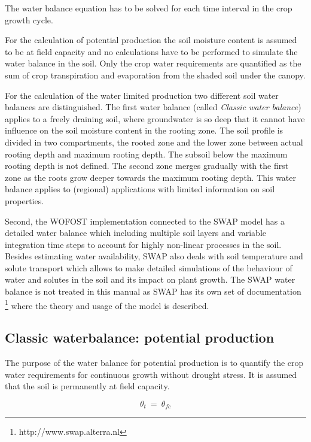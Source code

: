 The water balance equation has to be solved for each time interval in the crop growth cycle.

For the calculation of potential production the soil moisture content is
assumed to be at field capacity and no calculations have to be performed to simulate the
water balance in the soil. Only the crop water requirements are quantified as the sum of 
crop transpiration and evaporation from the shaded soil under the canopy. 

For the calculation of the water limited production two different soil water balances are
distinguished. The first water balance (called \emph{Classic water balance}) applies to a freely draining soil, 
where groundwater is so deep that it cannot have influence on the soil moisture content in the rooting zone. 
The soil profile is divided in two compartments, the rooted zone and the lower zone between actual rooting
depth and maximum rooting depth. The subsoil below the maximum rooting depth is not defined. The second
zone merges gradually with the first zone as the roots grow deeper towards the maximum rooting depth. 
This water balance applies to (regional) applications with limited information on soil properties.

Second, the WOFOST implementation connected to the SWAP model has a detailed water balance which 
including multiple soil layers and variable integration time steps to account for highly non-linear 
processes in the soil. Besides estimating water availability, SWAP also deals with soil temperature and 
solute transport which allows to make 
detailed simulations of the behaviour of water and solutes in the soil and its impact on plant growth.
The SWAP water balance is not treated in this manual as SWAP has its own set of documentation 
\footnote{http://www.swap.alterra.nl} where the theory and usage of the model is described.

\subsection{Classic waterbalance: potential production}
\label{sec:WATPP}

The purpose of the water balance for potential production is to quantify the crop water requirements for
continuous growth without drought stress. It is assumed that the soil is permanently at
field capacity.

\begin{equation}
\label{eq:6.15}
\theta  _{t} ~ =~\theta  _{fc} 
\end{equation}


